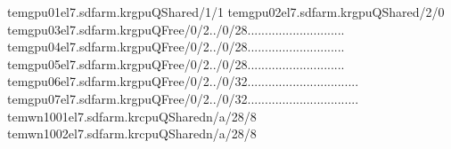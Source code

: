 \documentclass[a4paper,10pt,english]{sphinxmanual}
\begin{document}
\begin{sphinxVerbatim}[commandchars=\\\{\}]
tem\PYGZhy{}gpu01\PYGZhy{}el7.sdfarm.krgpuQShared/1/1\PYG{o}{[}\PYG{c+c1}{\PYGZsh{}.]        28/2/26  [\PYGZsh{}\PYGZsh{}..........................]}
tem\PYGZhy{}gpu02\PYGZhy{}el7.sdfarm.krgpuQShared/2/0\PYG{o}{[}\PYG{c+c1}{\PYGZsh{}\PYGZsh{}]        28/4/24  [\PYGZsh{}\PYGZsh{}\PYGZsh{}\PYGZsh{}........................]}
tem\PYGZhy{}gpu03\PYGZhy{}el7.sdfarm.krgpuQFree/0/2\PYG{o}{[}..\PYG{o}{]}/0/28\PYG{o}{[}............................\PYG{o}{]}
tem\PYGZhy{}gpu04\PYGZhy{}el7.sdfarm.krgpuQFree/0/2\PYG{o}{[}..\PYG{o}{]}/0/28\PYG{o}{[}............................\PYG{o}{]}
tem\PYGZhy{}gpu05\PYGZhy{}el7.sdfarm.krgpuQFree/0/2\PYG{o}{[}..\PYG{o}{]}/0/28\PYG{o}{[}............................\PYG{o}{]}
tem\PYGZhy{}gpu06\PYGZhy{}el7.sdfarm.krgpuQFree/0/2\PYG{o}{[}..\PYG{o}{]}/0/32\PYG{o}{[}................................\PYG{o}{]}
tem\PYGZhy{}gpu07\PYGZhy{}el7.sdfarm.krgpuQFree/0/2\PYG{o}{[}..\PYG{o}{]}/0/32\PYG{o}{[}................................\PYG{o}{]}
tem\PYGZhy{}wn1001\PYGZhy{}el7.sdfarm.krcpuQSharedn/a/28/8\PYG{o}{[}\PYG{c+c1}{\PYGZsh{}\PYGZsh{}\PYGZsh{}\PYGZsh{}\PYGZsh{}\PYGZsh{}\PYGZsh{}\PYGZsh{}\PYGZsh{}\PYGZsh{}\PYGZsh{}\PYGZsh{}\PYGZsh{}\PYGZsh{}\PYGZsh{}\PYGZsh{}\PYGZsh{}\PYGZsh{}\PYGZsh{}\PYGZsh{}\PYGZsh{}\PYGZsh{}\PYGZsh{}\PYGZsh{}\PYGZsh{}\PYGZsh{}\PYGZsh{}\PYGZsh{}........]}
tem\PYGZhy{}wn1002\PYGZhy{}el7.sdfarm.krcpuQSharedn/a/28/8\PYG{o}{[}\PYG{c+c1}{\PYGZsh{}\PYGZsh{}\PYGZsh{}\PYGZsh{}\PYGZsh{}\PYGZsh{}\PYGZsh{}\PYGZsh{}\PYGZsh{}\PYGZsh{}\PYGZsh{}\PYGZsh{}\PYGZsh{}\PYGZsh{}\PYGZsh{}\PYGZsh{}\PYGZsh{}\PYGZsh{}\PYGZsh{}\PYGZsh{}\PYGZsh{}\PYGZsh{}\PYGZsh{}\PYGZsh{}\PYGZsh{}\PYGZsh{}\PYGZsh{}\PYGZsh{}........]}

\end{sphinxVerbatim}
\end{document}
